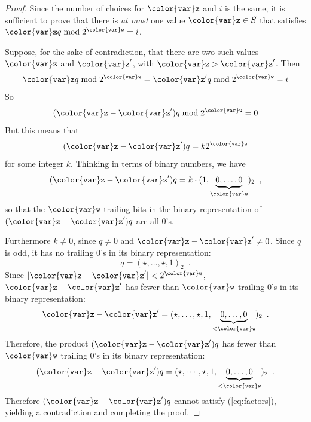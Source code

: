 \documentclass[10pt]{book}
\newcommand{\eqlabel}[1]{\label{eq:#1}}
\newcommand{\myeqref}[1]{(\ref{eq:#1})}
\theoremstyle{plain}
\theoremstyle{definition}
\begin{document}
\begin{proof}
  Since the number of choices for $\ensuremath{\mathtt{{\color{var}z}}}$ and $i$ is the same, it is
  sufficient to prove that there is \emph{at most} one value $\ensuremath{\mathtt{{\color{var}z}}}\in S$ that
  satisfies $\ensuremath{\mathtt{{\color{var}z}}}q\bmod 2^{\ensuremath{\mathtt{{\color{var}w}}}} = i$.

  Suppose, for the sake of contradiction, that there are two such values
  \ensuremath{\mathtt{{\color{var}z}}} and \ensuremath{\mathtt{{\color{var}z}'}}, with $\ensuremath{\mathtt{{\color{var}z}}}>\ensuremath{\mathtt{{\color{var}z}}}'$.  Then
  \[
     \ensuremath{\mathtt{{\color{var}z}}}q\bmod 2^{\ensuremath{\mathtt{{\color{var}w}}}} = \ensuremath{\mathtt{{\color{var}z}}}'q \bmod 2^{\ensuremath{\mathtt{{\color{var}w}}}} = i
  \]
  So
  \[ 
     (\ensuremath{\mathtt{{\color{var}z}}}-\ensuremath{\mathtt{{\color{var}z}}}')q\bmod 2^{\ensuremath{\mathtt{{\color{var}w}}}} = 0 
  \]
  But this means that 
  \begin{equation}
    (\ensuremath{\mathtt{{\color{var}z}}}-\ensuremath{\mathtt{{\color{var}z}}}')q = k 2^{\ensuremath{\mathtt{{\color{var}w}}}} \eqlabel{factors} 
  \end{equation}
  for some integer $k$.  Thinking in terms of binary numbers, we have 
  \[
    (\ensuremath{\mathtt{{\color{var}z}}}-\ensuremath{\mathtt{{\color{var}z}}}')q = k\cdot(1,\underbrace{0,\ldots,0}_{\ensuremath{\mathtt{{\color{var}w}}}})_2 \enspace ,
  \]
  so that the \ensuremath{\mathtt{{\color{var}w}}} trailing bits in the binary representation of
  $(\ensuremath{\mathtt{{\color{var}z}}}-\ensuremath{\mathtt{{\color{var}z}}}')q$ are all 0's.

  Furthermore $k\neq 0$, since $q\neq 0$ and $\ensuremath{\mathtt{{\color{var}z}}}-\ensuremath{\mathtt{{\color{var}z}}}'\neq 0$.  Since $q$
  is odd, it has no trailing 0's in its binary representation:
  \[
    q = (\star,\ldots,\star,1)_2 \enspace .
  \]
  Since $|\ensuremath{\mathtt{{\color{var}z}}}-\ensuremath{\mathtt{{\color{var}z}}}'| < 2^{\ensuremath{\mathtt{{\color{var}w}}}}$, $\ensuremath{\mathtt{{\color{var}z}}}-\ensuremath{\mathtt{{\color{var}z}}}'$ has fewer than \ensuremath{\mathtt{{\color{var}w}}} trailing
  0's in its binary representation:
  \[
    \ensuremath{\mathtt{{\color{var}z}}}-\ensuremath{\mathtt{{\color{var}z}}}' = (\star,\ldots,\star,1,\underbrace{0,\ldots,0}_{<\ensuremath{\mathtt{{\color{var}w}}}})_2
      \enspace .
  \]
  Therefore, the product $(\ensuremath{\mathtt{{\color{var}z}}}-\ensuremath{\mathtt{{\color{var}z}}}')q$ has fewer than \ensuremath{\mathtt{{\color{var}w}}} trailing 0's in
  its binary representation:
  \[
   (\ensuremath{\mathtt{{\color{var}z}}}-\ensuremath{\mathtt{{\color{var}z}}}')q = (\star,\cdots,\star,1,\underbrace{0,\ldots,0}_{<\ensuremath{\mathtt{{\color{var}w}}}})_2 
    \enspace .
  \]
  Therefore $(\ensuremath{\mathtt{{\color{var}z}}}-\ensuremath{\mathtt{{\color{var}z}}}')q$ cannot satisfy \myeqref{factors}, yielding a
  contradiction and completing the proof.
\end{proof}
\end{document}
